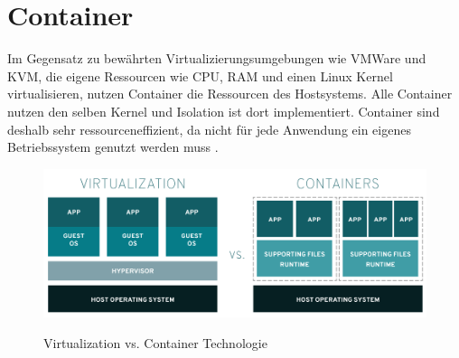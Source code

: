 \section{Container}
\label{sec:grundlagen:container}

Im Gegensatz zu bewährten Virtualizierungsumgebungen wie VMWare und KVM, 
die eigene Ressourcen wie CPU, RAM und einen Linux Kernel virtualisieren,
nutzen Container die Ressourcen des Hostsystems. 
Alle Container nutzen den selben Kernel und Isolation ist dort implementiert.
Container sind deshalb sehr ressourceneffizient, da nicht für jede Anwendung ein eigenes
Betriebssystem genutzt werden muss \cite{Kane2018}.

\begin{figure}
  \includegraphics[width=\textwidth]{gfx/chapters/2_grundlagen/virtualization-vs-containers.png}
  \label{fig:container:vergleich}
  \caption{Virtualization vs. Container Technologie}
\end{figure}